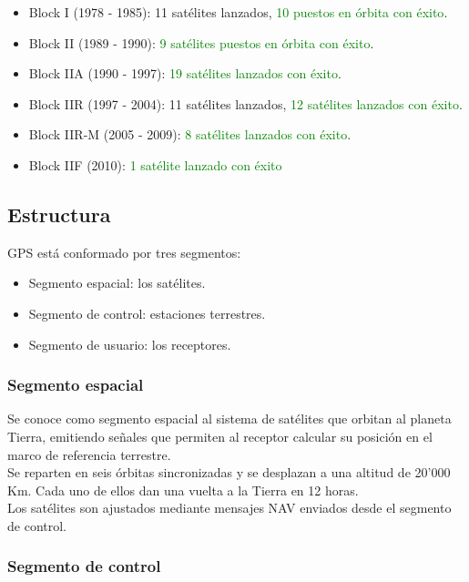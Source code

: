 \begin{itemize}
	\item Block I (1978 - 1985): 11 satélites lanzados, \textcolor{green}{10 puestos en órbita con éxito}.
	\item Block II (1989 - 1990): \textcolor{green}{9 satélites puestos en órbita con éxito}.
	\item Block IIA (1990 - 1997): \textcolor{green}{19 satélites lanzados con éxito}.
	\item Block IIR (1997 - 2004): 11 satélites lanzados, \textcolor{green}{12 satélites lanzados con éxito}.
	\item Block IIR-M (2005 - 2009): \textcolor{green}{8 satélites lanzados con éxito}.
	\item Block IIF (2010): \textcolor{green}{1 satélite lanzado con éxito} \citep{termal2014prototipo}
\end{itemize}

\subsection{Estructura}

GPS está conformado por tres segmentos:

\begin{itemize}
	\item Segmento espacial: los satélites.
	\item Segmento de control: estaciones terrestres.
	\item Segmento de usuario: los receptores.
\end{itemize}
	
\subsubsection{Segmento espacial}

Se conoce como segmento espacial al sistema de satélites que orbitan al planeta Tierra, emitiendo señales que permiten al receptor calcular su posición en el marco de referencia terrestre. \\

Se reparten en seis órbitas sincronizadas y se desplazan a una altitud de 20'000 Km. Cada uno de ellos dan una vuelta a la Tierra en 12 horas. \\

Los satélites son ajustados mediante mensajes NAV enviados desde el segmento de control.

\subsubsection{Segmento de control}

